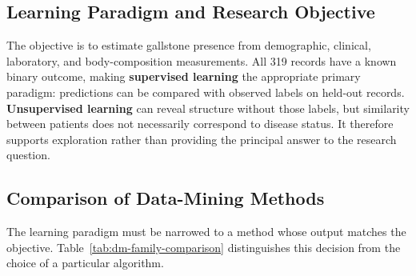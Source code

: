 \subsection{Learning Paradigm and Research Objective}
\label{subsec:matching-dm-methods}

The objective is to estimate gallstone presence from demographic, clinical,
laboratory, and body-composition measurements. All 319 records have a known
binary outcome, making \textbf{supervised learning} the appropriate primary
paradigm: predictions can be compared with observed labels on held-out records.
\textbf{Unsupervised learning} can reveal structure without those labels, but
similarity between patients does not necessarily correspond to disease
status. It therefore supports exploration rather than providing the principal
answer to the research question.

\subsection{Comparison of Data-Mining Methods}
\label{subsec:dm-family-comparison}

The learning paradigm must be narrowed to a method whose output matches the
objective. Table~\ref{tab:dm-family-comparison} distinguishes this decision
from the choice of a particular algorithm.

